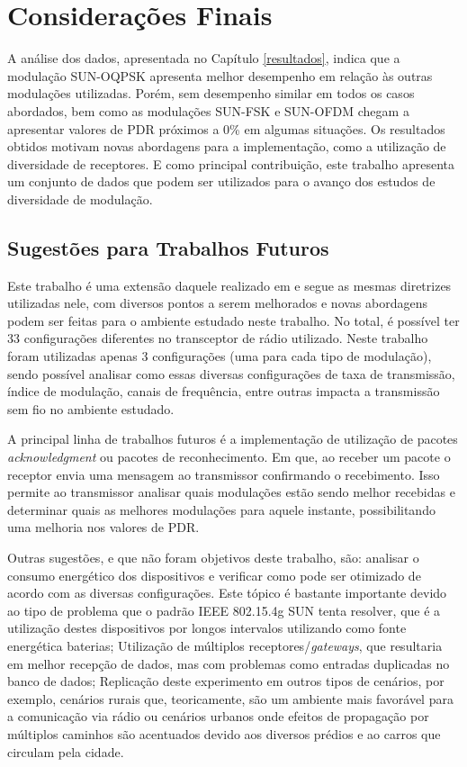 \chapter{Considerações Finais}
\label{cap:conclusao}
A análise dos dados, apresentada no Capítulo \ref{resultados}, indica que a modulação SUN-OQPSK apresenta melhor desempenho em relação às outras modulações utilizadas. Porém, sem desempenho similar em todos os casos abordados, bem como as modulações SUN-FSK e SUN-OFDM chegam a apresentar valores de PDR próximos a 0\% em algumas situações. Os resultados obtidos motivam novas abordagens para a implementação, como a utilização de diversidade de receptores. E como principal contribuição, este trabalho apresenta um conjunto de dados que podem ser utilizados para o avanço dos estudos de diversidade de modulação.

\section{Sugestões para Trabalhos Futuros}
\label{sec:futuros}
Este trabalho é uma extensão daquele realizado em \cite{tuset2020dataset} e segue as mesmas diretrizes utilizadas nele, com diversos pontos a serem melhorados e novas abordagens podem ser feitas para o ambiente estudado neste trabalho. No total, é possível ter 33 configurações diferentes no transceptor de rádio utilizado. Neste trabalho foram utilizadas apenas 3 configurações (uma para cada tipo de modulação), sendo possível analisar como essas diversas configurações de taxa de transmissão, índice de modulação, canais de frequência, entre outras impacta a transmissão sem fio no ambiente estudado.

A principal linha de trabalhos futuros é a implementação de utilização de pacotes \emph{acknowledgment} ou pacotes de reconhecimento. Em que, ao receber um pacote o receptor envia uma mensagem ao transmissor confirmando o recebimento. Isso permite ao transmissor analisar quais modulações estão sendo melhor recebidas e determinar quais as melhores modulações para aquele instante, possibilitando uma melhoria nos valores de PDR.

Outras sugestões, e que não foram objetivos deste trabalho, são: analisar o consumo energético dos dispositivos e verificar como pode ser otimizado de acordo com as diversas configurações. Este tópico é bastante importante devido ao tipo de problema que o padrão IEEE 802.15.4g SUN tenta resolver, que é a utilização destes dispositivos por longos intervalos utilizando como fonte energética baterias; Utilização de múltiplos receptores/\emph{gateways}, que resultaria em melhor recepção de dados, mas com problemas como entradas duplicadas no banco de dados; Replicação deste experimento em outros tipos de cenários, por exemplo, cenários rurais que, teoricamente, são um ambiente mais favorável para a comunicação via rádio ou cenários urbanos onde efeitos de propagação por múltiplos caminhos são acentuados devido aos diversos prédios e ao carros que circulam pela cidade.